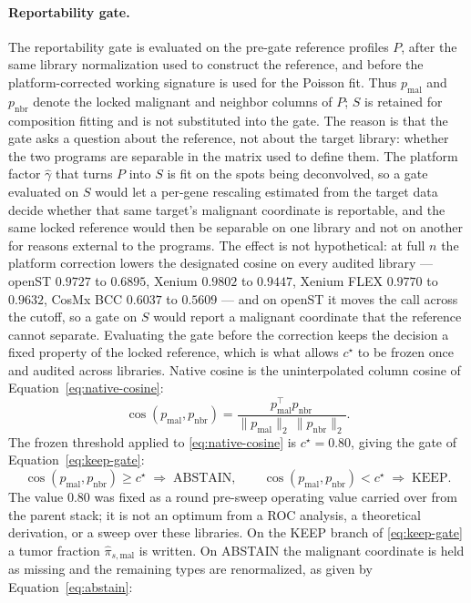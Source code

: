 \paragraph{Reportability gate.}
The reportability gate is evaluated on the pre-gate reference profiles \(P\), after the same library normalization used to construct the reference, and before the platform-corrected working signature is used for the Poisson fit. Thus \(p_{\mathrm{mal}}\) and \(p_{\mathrm{nbr}}\) denote the locked malignant and neighbor columns of \(P\); \(S\) is retained for composition fitting and is not substituted into the gate. The reason is that the gate asks a question about the reference, not about the target library: whether the two programs are separable in the matrix used to define them. The platform factor \(\hat\gamma\) that turns \(P\) into \(S\) is fit on the spots being deconvolved, so a gate evaluated on \(S\) would let a per-gene rescaling estimated from the target data decide whether that same target's malignant coordinate is reportable, and the same locked reference would then be separable on one library and not on another for reasons external to the programs. The effect is not hypothetical: at full \(n\) the platform correction lowers the designated cosine on every audited library --- openST \(0.9727\) to \(0.6895\), Xenium \(0.9802\) to \(0.9447\), Xenium FLEX \(0.9770\) to \(0.9632\), CosMx BCC \(0.6037\) to \(0.5609\) --- and on openST it moves the call across the cutoff, so a gate on \(S\) would report a malignant coordinate that the reference cannot separate. Evaluating the gate before the correction keeps the decision a fixed property of the locked reference, which is what allows \(c^\star\) to be frozen once and audited across libraries.
Native cosine is the uninterpolated column cosine of Equation~\eqref{eq:native-cosine}:
\begin{equation}
\cos(p_{\mathrm{mal}},p_{\mathrm{nbr}})=\frac{p_{\mathrm{mal}}^{\top}p_{\mathrm{nbr}}}{\lVert p_{\mathrm{mal}}\rVert_2\,\lVert p_{\mathrm{nbr}}\rVert_2}.
\label{eq:native-cosine}
\end{equation}
The frozen threshold applied to \eqref{eq:native-cosine} is \(c^\star=0.80\), giving the gate of Equation~\eqref{eq:keep-gate}:
\begin{equation}
\cos(p_{\mathrm{mal}},p_{\mathrm{nbr}})\ge c^\star \;\Rightarrow\; \text{ABSTAIN},\qquad
\cos(p_{\mathrm{mal}},p_{\mathrm{nbr}})< c^\star \;\Rightarrow\; \text{KEEP}.
\label{eq:keep-gate}
\end{equation}
The value \(0.80\) was fixed as a round pre-sweep operating value carried over from the parent stack; it is not an optimum from a ROC analysis, a theoretical derivation, or a sweep over these libraries. On the KEEP branch of \eqref{eq:keep-gate} a tumor fraction \(\hat\pi_{s,\mathrm{mal}}\) is written. On ABSTAIN the malignant coordinate is held as missing and the remaining types are renormalized, as given by Equation~\eqref{eq:abstain}:
